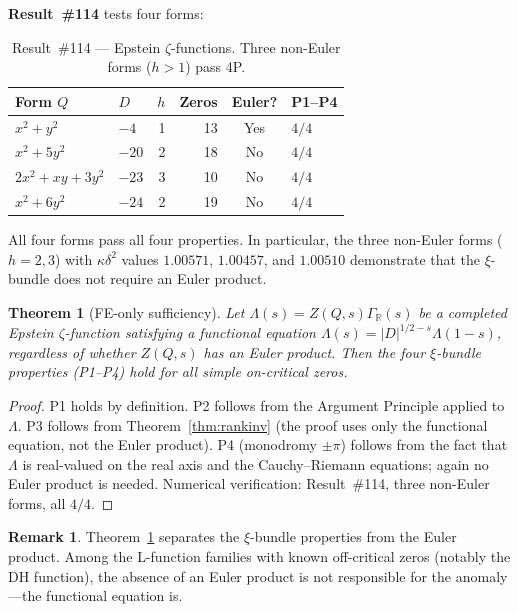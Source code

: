 \documentclass[11pt, a4paper]{article}
\theoremstyle{plain}
\newtheorem{theorem}{Theorem}
\theoremstyle{definition}
\newtheorem{remark}{Remark}[section]
\begin{document}
\textbf{Result~\#114} tests four forms:

\begin{table}[ht]
\centering
\caption{Result~\#114 — Epstein $\zeta$-functions.  Three non-Euler forms ($h>1$) pass 4P.}
\label{tab:ep114}
\small
\begin{tabular}{llrrcl}
\toprule
Form $Q$ & $D$ & $h$ & Zeros & Euler? & P1--P4 \\
\midrule
$x^{2}+y^{2}$           & $-4$  & 1 & 13 & Yes & $4/4$ \\
$x^{2}+5y^{2}$          & $-20$ & 2 & 18 & No  & $4/4$ \\
$2x^{2}+xy+3y^{2}$      & $-23$ & 3 & 10 & No  & $4/4$ \\
$x^{2}+6y^{2}$          & $-24$ & 2 & 19 & No  & $4/4$ \\
\bottomrule
\end{tabular}
\end{table}

All four forms pass all four properties.  In particular, the three
non-Euler forms ($h=2,3$) with $\kappa\delta^{2}$ values
$1.00571$, $1.00457$, and $1.00510$ demonstrate that the $\xi$-bundle
does not require an Euler product.

\begin{theorem}[FE-only sufficiency]
\label{thm:feonly}
  Let $\Lambda(s)=Z(Q,s)\Gamma_{\mathbb{R}}(s)$ be a completed Epstein
  $\zeta$-function satisfying a functional equation $\Lambda(s)=|D|^{1/2-s}
  \Lambda(1-s)$, regardless of whether $Z(Q,s)$ has an Euler product.
  Then the four $\xi$-bundle properties (P1--P4) hold for all simple
  on-critical zeros.
\end{theorem}

\begin{proof}
  P1 holds by definition.  P2 follows from the Argument Principle applied
  to $\Lambda$.  P3 follows from Theorem~\ref{thm:rankinv} (the proof uses
  only the functional equation, not the Euler product).  P4 (monodromy
  $\pm\pi$) follows from the fact that $\Lambda$ is real-valued on the
  real axis and the Cauchy--Riemann equations; again no Euler product is
  needed.  Numerical verification: Result~\#114, three non-Euler forms,
  all $4/4$.
\end{proof}

\begin{remark}
  Theorem~\ref{thm:feonly} separates the $\xi$-bundle properties from
  the Euler product.  Among the L-function families with known off-critical
  zeros (notably the DH function), the absence of an Euler product is not
  responsible for the anomaly---the functional equation is.
\end{remark}
\end{document}
